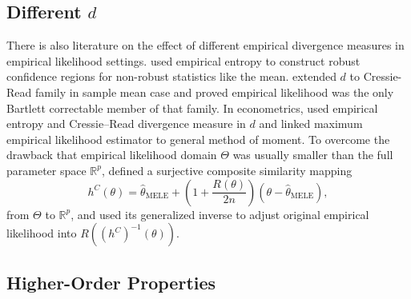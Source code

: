 \subsection{Different $d$ }

There is also literature on the effect of different empirical divergence
measures in empirical likelihood settings. \citet{hall1999biased}
used empirical entropy to construct robust confidence regions for
non-robust statistics like the mean. \citet{baggerly1998empirical}
extended $d$ to Cressie-Read family in sample mean case and proved
empirical likelihood was the only Bartlett correctable member of that
family. In econometrics, \citet{mittelhammer2000econometric} used
empirical entropy and Cressie--Read divergence measure in $d$ and
linked maximum empirical likelihood estimator to general method of
moment. To overcome the drawback that empirical likelihood domain
$\Theta$ was usually smaller than the full parameter space $\mathbb{R}^{p}$,
\citet{tsao2014extended} defined a surjective composite similarity
mapping 
\[
h^{C}\left(\theta\right)=\hat{\theta}_{\mathrm{MELE}}+\left(1+\frac{R\left(\theta\right)}{2n}\right)\left(\theta-\hat{\theta}_{\mathrm{MELE}}\right),
\]
from $\Theta$ to $\mathbb{R}^{p}$, and used its generalized inverse
to adjust original empirical likelihood into $R\left(\left(h^{C}\right)^{-1}\left(\theta\right)\right)$. 


\subsection{Higher-Order Properties }

